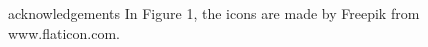 \begin{acks}
acknowledgements
In Figure 1, the icons are made by Freepik from www.flaticon.com.
\end{acks}